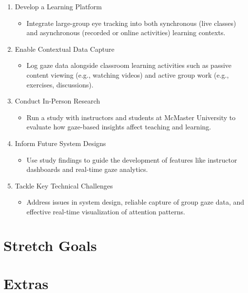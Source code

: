 \documentclass{article}
\begin{document}
\begin{enumerate}
    \item Develop a Learning Platform
    \begin{itemize}
        \item Integrate large-group eye tracking into both synchronous (live classes) 
        and asynchronous (recorded or online activities) learning contexts.
    \end{itemize}

    \item Enable Contextual Data Capture
    \begin{itemize}
        \item Log gaze data alongside classroom learning activities such as passive 
        content viewing (e.g., watching videos) and active group work 
        (e.g., exercises, discussions).
    \end{itemize}

    \item Conduct In-Person Research
    \begin{itemize}
        \item Run a study with instructors and students at McMaster University 
        to evaluate how gaze-based insights affect teaching and learning.
    \end{itemize}

    \item Inform Future System Designs
    \begin{itemize}
        \item Use study findings to guide the development of features like 
        instructor dashboards and real-time gaze analytics.
    \end{itemize}

    \item Tackle Key Technical Challenges
    \begin{itemize}
        \item Address issues in system design, reliable capture of group gaze data, 
        and effective real-time visualization of attention patterns.
    \end{itemize}
\end{enumerate}

\section{Stretch Goals}

\section{Extras}
\end{document}
